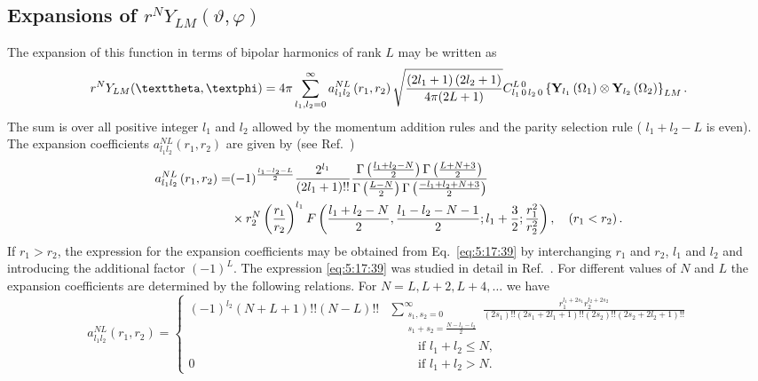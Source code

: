 \subsection{Expansions of $r^{N} Y_{L M}(\vartheta, \varphi)$}\label{sec:5.17.7}
The expansion of this function in terms of bipolar harmonics of rank $L$ may be written as
\begin{equation}
r^{N} Y_{L M}(\vartheta, \varphi)=4 \pi \sum_{l_{1}, l_{2}=0}^{\infty} a_{l_{1} l_{2}}^{N L}\left(r_{1}, r_{2}\right) \sqrt{\frac{\left(2 l_{1}+1\right)\left(2 l_{2}+1\right)}{4 \pi(2 L+1)}} \clebsch{l_{1}}{0}{l_{2}}{0}{L}{0}\left\{\vect{Y}_{l_{1}}\left(\Omega_{1}\right) \otimes \vect{Y}_{l_{2}}\left(\Omega_{2}\right)\right\}_{L M}. \label{eq:5:17:38}
\end{equation}
The sum is over all positive integer $l_{1}$ and $l_{2}$ allowed by the momentum addition rules and the parity selection rule ( $l_{1}+l_{2}-L$ is even). The expansion coefficients $a_{l_{1} l_{2}}^{N L}\left(r_{1}, r_{2}\right)$ are given by (see Ref.~\cite{ref098})
\begin{align}
a_{l_{1} l_{2}}^{N L}\left(r_{1}, r_{2}\right)= & (-1)^{\frac{l_{1}-l_{2}-L}{2}} \frac{2^{l_{1}}}{\left(2 l_{1}+1\right)!!} \frac{\Gamma\left(\frac{l_{1}+l_{2}-N}{2}\right) \Gamma\left(\frac{L+N+3}{2}\right)}{\Gamma\left(\frac{L-N}{2}\right) \Gamma\left(\frac{-l_{1}+l_{2}+N+3}{2}\right)}  \notag\\
& \times r_{2}^{N}\left(\frac{r_{1}}{r_{2}}\right)^{l_{1}} F\left(\frac{l_{1}+l_{2}-N}{2}, \frac{l_{1}-l_{2}-N-1}{2} ; l_{1}+\frac{3}{2} ; \frac{r_{1}^{2}}{r_{2}^{2}}\right),\quad\left(r_{1}<r_{2}\right) . \label{eq:5:17:39}
\end{align}
If $r_{1}>r_{2}$, the expression for the expansion coefficients may be obtained from Eq.~\eqref{eq:5:17:39} by interchanging $r_{1}$ and $r_{2}$, $l_{1}$ and $l_{2}$ and introducing the additional factor $(-1)^{L}$. The expression \eqref{eq:5:17:39} was studied in detail in Ref.~\cite{ref078}. For different values of $N$ and $L$ the expansion coefficients are determined by the following relations. For $N=L, L+2, L+4, \ldots$ we have
\begin{equation}
a_{l_{1} l_{2}}^{N L}\left(r_{1}, r_{2}\right)= \begin{cases}\displaystyle  (-1)^{l_{2}}(N+L+1)!!(N-L)!! & {\displaystyle\sum_{\substack{s_{1}, s_{2}=0\\s_{1}+s_{2}=\frac{N-l_{1}-l_{2}}{2}}}^{\infty} \frac{r_{1}^{l_{1}+2 s_{1}} r_{2}^{l_{2}+2 s_{2}}}{\left(2 s_{1}\right) !!\left(2 s_{1}+2 l_{1}+1\right) !!\left(2 s_{2}\right) !!\left(2 s_{2}+2 l_{2}+1\right) !!} } \\ 
 & \qquad\text { if } l_{1}+l_{2} \leq N, \\ 0 & \qquad\text { if } l_{1}+l_{2}>N .\end{cases}\label{eq:5:17:40}
\end{equation}

